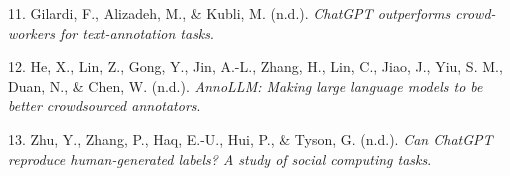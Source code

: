 \documentclass[
  10pt,
  twocolumn]{article}
\newlength{\cslhangindent}
\newlength{\cslentryspacingunit} %
\newenvironment{CSLReferences}[2] %
 {%
  \setlength{\parindent}{0pt}
  \ifodd #1
  \let\oldpar\par
  \def\par{\hangindent=\cslhangindent\oldpar}
  \fi
  \setlength{\parskip}{#2\cslentryspacingunit}
 }%
 {}
\begin{document}
\begin{CSLReferences}{1}{0}
\leavevmode{}%
11. Gilardi, F., Alizadeh, M., \& Kubli, M. (n.d.). \emph{ChatGPT
outperforms crowd-workers for text-annotation tasks}.

\leavevmode{}%
12. He, X., Lin, Z., Gong, Y., Jin, A.-L., Zhang, H., Lin, C., Jiao, J.,
Yiu, S. M., Duan, N., \& Chen, W. (n.d.). \emph{AnnoLLM: Making large
language models to be better crowdsourced annotators}.

\leavevmode{}%
13. Zhu, Y., Zhang, P., Haq, E.-U., Hui, P., \& Tyson, G. (n.d.).
\emph{Can ChatGPT reproduce human-generated labels? A study of social
computing tasks}.

\end{CSLReferences}
\end{document}
